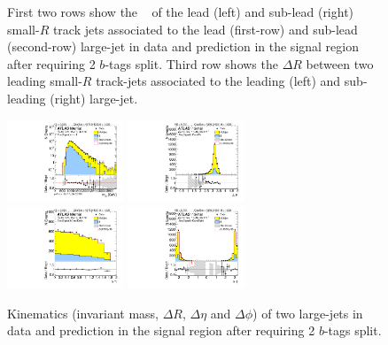 \begin{figure}[htbp!]
\begin{center}
  \caption{First two rows show the \pt~ of the lead (left) and sub-lead (right) small-$R$ track jets associated to the lead (first-row) and sub-lead (second-row) large-\R jet in data and prediction in the signal region after requiring 2 $b$-tags split. Third row shows the $\Delta R$ between two leading small-$R$ track-jets associated to the leading (left) and sub-leading (right) large-\R jet.  }
  \label{fig:boosted-2bs-signal-ak2}
\end{center}
\end{figure}


\begin{figure}[htbp!]
\begin{center}
\includegraphics[width=0.31\textwidth,angle=-90]{figures/boosted/Signal/b77_TwoTag_split_Signal_mHH_l_1.pdf}
\includegraphics[width=0.31\textwidth,angle=-90]{figures/boosted/Signal/b77_TwoTag_split_Signal_hCandDr.pdf}\\
\includegraphics[width=0.31\textwidth,angle=-90]{figures/boosted/Signal/b77_TwoTag_split_Signal_hCandDeta.pdf}
\includegraphics[width=0.31\textwidth,angle=-90]{figures/boosted/Signal/b77_TwoTag_split_Signal_hCandDphi.pdf}
  \caption{Kinematics (invariant mass, $\Delta R$, $\Delta \eta$ and $\Delta \phi$) of two large-\R jets in data and prediction in the signal region after requiring 2 $b$-tags split.  }
  \label{fig:boosted-2bs-signal-ak10-system}
\end{center}
\end{figure}


\clearpage
